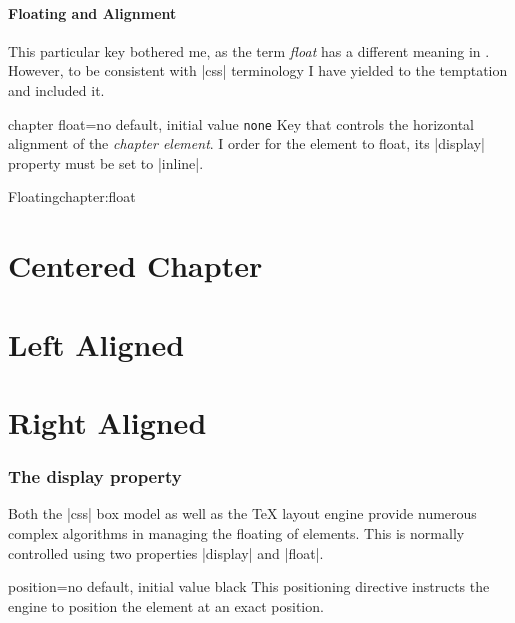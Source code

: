 \subsubsection{Floating and Alignment} 

This particular key bothered me, as the term \emph{float} has a different meaning in \latexe. However, to
be consistent with |css| terminology I have yielded to the temptation and included it.

\begin{docKey}[]{chapter float}{=}{no default, initial value \texttt{none}}
Key that controls the horizontal alignment of the \emph{chapter element}. I order for the
element to float, its |display| property must be set to |inline|.
\end{docKey}

\begin{texexample}{Floating}{chapter:float}
\chapter{Centered Chapter}
\lorem
{}
\chapter{Left Aligned}
\lorem
{}
\chapter{Right Aligned}
\lorem
\end{texexample}

\subsection{The display property}

Both the |css| box model as well as the TeX layout engine provide numerous complex algorithms in managing the floating of elements. This is normally controlled using two properties |display| and |float|.

\newpage
\makeatletter

\begin{docKey}[]{position}{=}{no default, initial value black}
This positioning directive instructs the engine to position the element at an exact position.
\end{docKey}



